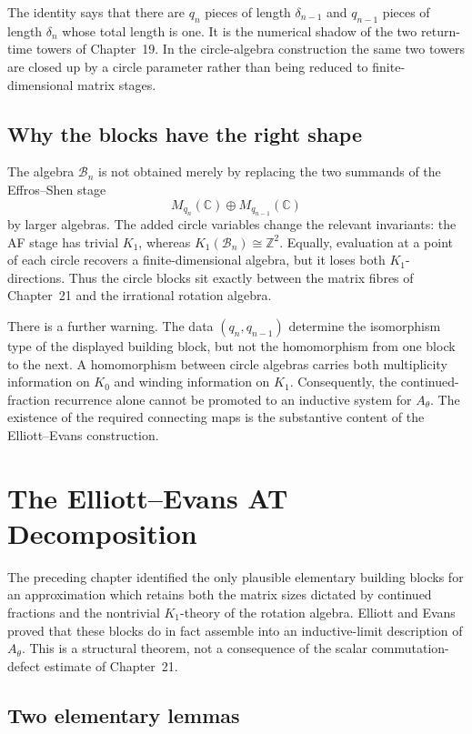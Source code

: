 \documentclass{book}
\begin{document}
The identity says that there are \(q_n\) pieces of length
\(\delta_{n-1}\) and \(q_{n-1}\) pieces of length \(\delta_n\) whose
total length is one.  It is the numerical shadow of the two return-time
towers of Chapter~19.  In the circle-algebra construction the same two
towers are closed up by a circle parameter rather than being reduced to
finite-dimensional matrix stages.

\section{Why the blocks have the right shape}

The algebra \(\mathcal B_n\) is not obtained merely by replacing the two
summands of the Effros--Shen stage
\[
  M_{q_n}(\mathbb C)\oplus M_{q_{n-1}}(\mathbb C)
\]
by larger algebras.  The added circle variables change the relevant
invariants: the AF stage has trivial \(K_1\), whereas
\(K_1(\mathcal B_n)\cong\mathbb Z^2\).  Equally, evaluation at a point of
each circle recovers a finite-dimensional algebra, but it loses both
\(K_1\)-directions.  Thus the circle blocks sit exactly between the matrix
fibres of Chapter~21 and the irrational rotation algebra.

There is a further warning.  The data \((q_n,q_{n-1})\) determine the
isomorphism type of the displayed building block, but not the homomorphism
from one block to the next.  A homomorphism between circle algebras carries
both multiplicity information on \(K_0\) and winding information on
\(K_1\).  Consequently, the continued-fraction recurrence alone cannot
be promoted to an inductive system for \(A_\theta\).  The existence of the
required connecting maps is the substantive content of the
Elliott--Evans construction.

\chapter{The Elliott--Evans AT Decomposition}

The preceding chapter identified the only plausible elementary building
blocks for an approximation which retains both the matrix sizes dictated by
continued fractions and the nontrivial \(K_1\)-theory of the rotation
algebra.  Elliott and Evans proved that these blocks do in fact assemble
into an inductive-limit description of \(A_\theta\).  This is a structural
theorem, not a consequence of the scalar commutation-defect estimate of
Chapter~21.

\section{Two elementary lemmas}
\end{document}
